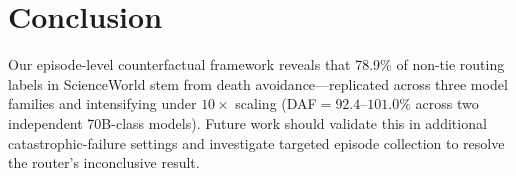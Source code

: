 \section{Conclusion}

Our episode-level counterfactual framework reveals that 78.9\% of non-tie routing labels in ScienceWorld stem from death avoidance---replicated across three model families and intensifying under $10{\times}$ scaling (DAF${}=92.4$--$101.0\%$ across two independent 70B-class models). Future work should validate this in additional catastrophic-failure settings and investigate targeted episode collection to resolve the router's inconclusive result.
